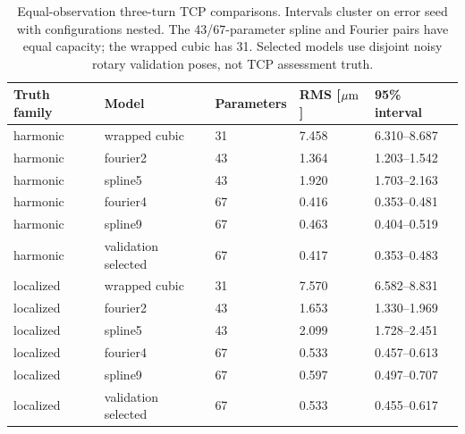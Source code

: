 \begin{table}[H]\centering\small
\begin{tabular}{lllll}\toprule
Truth family & Model & Parameters & RMS [$\mu\mathrm{m}$] & 95\% interval\\\midrule
harmonic & wrapped cubic & 31 & 7.458 & 6.310--8.687\\
harmonic & fourier2 & 43 & 1.364 & 1.203--1.542\\
harmonic & spline5 & 43 & 1.920 & 1.703--2.163\\
harmonic & fourier4 & 67 & 0.416 & 0.353--0.481\\
harmonic & spline9 & 67 & 0.463 & 0.404--0.519\\
harmonic & validation selected & 67 & 0.417 & 0.353--0.483\\
localized & wrapped cubic & 31 & 7.570 & 6.582--8.831\\
localized & fourier2 & 43 & 1.653 & 1.330--1.969\\
localized & spline5 & 43 & 2.099 & 1.728--2.451\\
localized & fourier4 & 67 & 0.533 & 0.457--0.613\\
localized & spline9 & 67 & 0.597 & 0.497--0.707\\
localized & validation selected & 67 & 0.533 & 0.455--0.617\\
\bottomrule\end{tabular}
\caption{Equal-observation three-turn TCP comparisons. Intervals cluster on error seed with configurations nested. The 43/67-parameter spline and Fourier pairs have equal capacity; the wrapped cubic has 31. Selected models use disjoint noisy rotary validation poses, not TCP assessment truth.}\label{tab:journal_rep}
\end{table}
